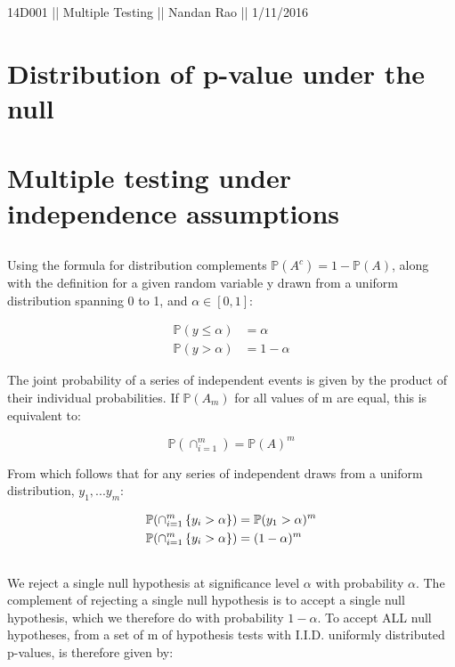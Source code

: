\documentclass[a4paper,12pt]{article}\usepackage[]{graphicx}\usepackage[]{color}
\begin{document}
\normalsize 14D001 || Multiple Testing || Nandan Rao || 1/11/2016

\section{Distribution of p-value under the null}

\subsection{}


\section{Multiple testing under independence assumptions}

\subsection{}

Using the formula for distribution complements $\mathbb{P}(A^c) = 1 - \mathbb{P}(A)$, along with the definition for a given random variable y drawn from a uniform distribution spanning 0 to 1, and $\alpha \in [0, 1]$:

\begin{align*}
\mathbb{P}(y \leq \alpha) &= \alpha \\
\mathbb{P}(y > \alpha) &= 1 - \alpha
\end{align*}

The joint probability of a series of independent events is given by the product of their individual probabilities. If $\mathbb{P}(A_m)$ for all values of m are equal, this is equivalent to:

$$
\mathbb{P}(\cap_{i=1}^m) = \mathbb{P}(A)^m
$$

From which follows that for any series of independent draws from a uniform distribution, $y_1, ... y_m$:

\begin{align*}
\mathbb{P}(\cap_{i=1}^m \set{y_i > \alpha}) &= \mathbb{P}(y_1 > \alpha)^m \\
\mathbb{P}(\cap_{i=1}^m \set{y_i > \alpha}) &= (1 - \alpha)^m
\end{align*}

\subsection{}

We reject a single null hypothesis at significance level $\alpha$ with probability $\alpha$. The complement of rejecting a single null hypothesis is to accept a single null hypothesis, which we therefore do with probability $1 - \alpha$. To accept ALL null hypotheses, from a set of m of hypothesis tests with I.I.D. uniformly distributed p-values, is therefore given by:
\end{document}
